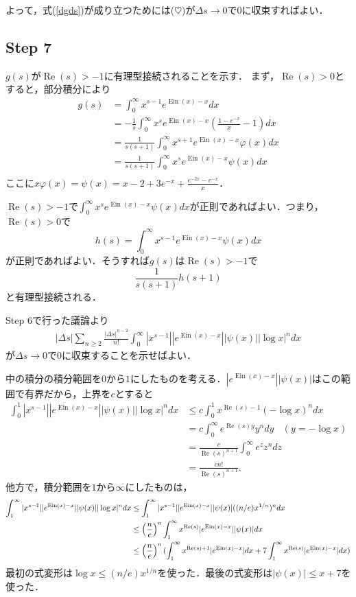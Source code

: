 \documentclass{jsarticle}
\newcommand{\Ein}{\operatorname{Ein}}
\renewcommand\Re{\operatorname{Re}}
\theoremstyle{definition}
\begin{document}
よって，式(\ref{dgds})が成り立つためには($\heartsuit$)が$\Delta s \to 0$で$0$に収束すればよい．

\subsection*{Step 7}
$g(s)$が$\Re(s) > -1$に有理型接続されることを示す．
まず，$\Re(s) > 0$とすると，部分積分により
\begin{align*}
g(s) &= \int_0^\infty x^{s-1} e^{\Ein(x)-x} dx \\
&= -\frac{1}{s} \int_0^\infty x^s e^{\Ein(x)-x} \left(\frac{1-e^{-x}}{x} - 1\right) dx \\
&= \frac{1}{s (s+1)} \int_0^\infty x^{s+1} e^{\Ein(x)-x} \varphi(x) dx \\
&= \frac{1}{s (s+1)} \int_0^\infty x^{s} e^{\Ein(x)-x} \psi(x) dx \\
\end{align*}
ここに$x \varphi(x) = \psi(x) = x - 2 + 3 e^{-x} + \frac{e^{-2x} - e^{-x}}{x}$．

$\Re(s) > -1$で$\int_0^\infty x^{s} e^{\Ein(x)-x} \psi(x) dx$が正則であればよい．つまり，
$\Re(s) > 0$で
\[
h(s) = \int_0^\infty x^{s-1} e^{\Ein(x)-x} \psi(x) dx
\]
が正則であればよい．そうすれば$g(s)$は$\Re(s) > -1$で
\[
\frac{1}{s(s+1)} h(s+1)
\]
と有理型接続される．

Step 6で行った議論より
\begin{align}
|\Delta s| \sum_{n\ge 2} \frac{|\Delta s|^{n-2}}{n!} \int_{0}^\infty |x^{s-1}| |e^{\Ein(x)-x}| |\psi(x)| |\log x|^n dx \label{dgdserr}
\end{align}
が$\Delta s \to 0$で$0$に収束することを示せばよい．

中の積分の積分範囲を$0$から$1$にしたものを考える．$|e^{\Ein(x)-x}| |\psi(x)|$はこの範囲で有界だから，上界を$c$とすると
\begin{align*}
\int_0^1 |x^{s-1}| |e^{\Ein(x)-x}| |\psi(x)| |\log x|^n dx
&\le c \int_0^1 x^{\Re(s)-1} (-\log x)^n dx \\
&= c \int_0^\infty e^{\Re(s) y} y^n dy\ \ \ \ (y = - \log x) \\
&= \frac{c}{\Re(s)^{n+1}} \int_0^\infty e^{z} z^n dz \\
&= \frac{c n!}{\Re(s)^{n+1}}.
\end{align*}
他方で，積分範囲を$1$から$\infty$にしたものは，
\begin{align}
\int_1^\infty |x^{s-1}| |e^{\Ein(x)-x}| |\psi(x)| |\log x|^n dx
&\le \int_1^\infty |x^{s-1}| |e^{\Ein(x)-x}| |\psi(x)| ((n/e) x^{1/n})^n dx \notag \\
&\le \left(\frac{n}{e}\right)^n \int_1^\infty x^{\Re(s)} |e^{\Ein(x)-x}| |\psi(x)| dx \notag \\
&\le \left(\frac{n}{e}\right)^n (\int_1^\infty x^{\Re(s)+1} |e^{\Ein(x)-x}| dx + 7\int_1^\infty x^{\Re(s)} |e^{\Ein(x)-x}| dx) \label{int1inf}
\end{align}
最初の式変形は$\log x \le (n/e) x^{1/n}$を使った．最後の式変形は$|\psi(x)| \le x + 7$を使った．
\end{document}

